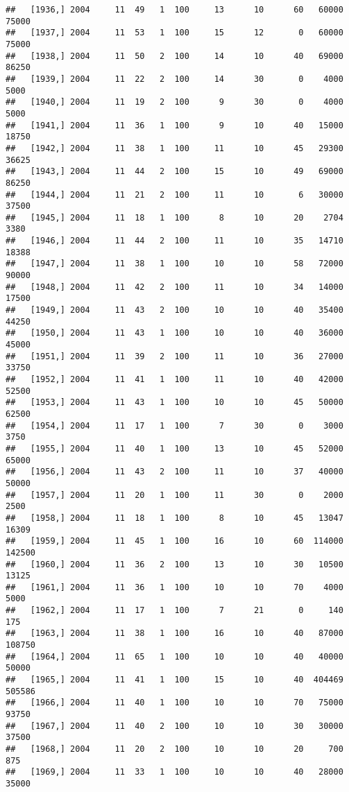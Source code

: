 \documentclass{article}\usepackage[]{graphicx}\usepackage[]{color}
\makeatletter
\newenvironment{kframe}{%
 \def\at@end@of@kframe{}%
 \ifinner\ifhmode%
  \def\at@end@of@kframe{\end{minipage}}%
  \begin{minipage}{\columnwidth}%
 \fi\fi%
 \def\FrameCommand##1{\hskip\@totalleftmargin \hskip-\fboxsep
 \colorbox{shadecolor}{##1}\hskip-\fboxsep
     \hskip-\linewidth \hskip-\@totalleftmargin \hskip\columnwidth}%
 \MakeFramed {\advance\hsize-\width
   \@totalleftmargin\z@ \linewidth\hsize
   \@setminipage}}%
 {\par\unskip\endMakeFramed%
 \at@end@of@kframe}
\newenvironment{knitrout}{}{} %
\makeatother
\begin{document}
\begin{knitrout}
\begin{kframe}
\begin{verbatim}
##   [1936,] 2004     11  49   1  100     13      10      60   60000   75000
##   [1937,] 2004     11  53   1  100     15      12       0   60000   75000
##   [1938,] 2004     11  50   2  100     14      10      40   69000   86250
##   [1939,] 2004     11  22   2  100     14      30       0    4000    5000
##   [1940,] 2004     11  19   2  100      9      30       0    4000    5000
##   [1941,] 2004     11  36   1  100      9      10      40   15000   18750
##   [1942,] 2004     11  38   1  100     11      10      45   29300   36625
##   [1943,] 2004     11  44   2  100     15      10      49   69000   86250
##   [1944,] 2004     11  21   2  100     11      10       6   30000   37500
##   [1945,] 2004     11  18   1  100      8      10      20    2704    3380
##   [1946,] 2004     11  44   2  100     11      10      35   14710   18388
##   [1947,] 2004     11  38   1  100     10      10      58   72000   90000
##   [1948,] 2004     11  42   2  100     11      10      34   14000   17500
##   [1949,] 2004     11  43   2  100     10      10      40   35400   44250
##   [1950,] 2004     11  43   1  100     10      10      40   36000   45000
##   [1951,] 2004     11  39   2  100     11      10      36   27000   33750
##   [1952,] 2004     11  41   1  100     11      10      40   42000   52500
##   [1953,] 2004     11  43   1  100     10      10      45   50000   62500
##   [1954,] 2004     11  17   1  100      7      30       0    3000    3750
##   [1955,] 2004     11  40   1  100     13      10      45   52000   65000
##   [1956,] 2004     11  43   2  100     11      10      37   40000   50000
##   [1957,] 2004     11  20   1  100     11      30       0    2000    2500
##   [1958,] 2004     11  18   1  100      8      10      45   13047   16309
##   [1959,] 2004     11  45   1  100     16      10      60  114000  142500
##   [1960,] 2004     11  36   2  100     13      10      30   10500   13125
##   [1961,] 2004     11  36   1  100     10      10      70    4000    5000
##   [1962,] 2004     11  17   1  100      7      21       0     140     175
##   [1963,] 2004     11  38   1  100     16      10      40   87000  108750
##   [1964,] 2004     11  65   1  100     10      10      40   40000   50000
##   [1965,] 2004     11  41   1  100     15      10      40  404469  505586
##   [1966,] 2004     11  40   1  100     10      10      70   75000   93750
##   [1967,] 2004     11  40   2  100     10      10      30   30000   37500
##   [1968,] 2004     11  20   2  100     10      10      20     700     875
##   [1969,] 2004     11  33   1  100     10      10      40   28000   35000

\end{verbatim}
\end{kframe}
\end{knitrout}
\end{document}
